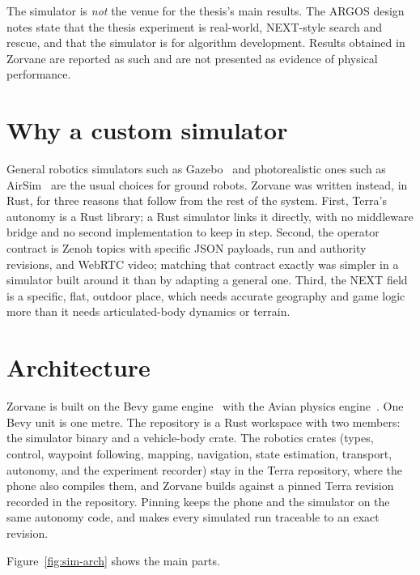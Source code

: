 The simulator is \emph{not} the venue for the thesis's main results.
The ARGOS design notes state that the thesis experiment is real-world, NEXT-style search and rescue, and that the simulator is for algorithm development.
Results obtained in Zorvane are reported as such and are not presented as evidence of physical performance.

\section{Why a custom simulator}
\label{sec:sim-why}

General robotics simulators such as Gazebo~\citep{koenig2004gazebo} and photorealistic ones such as AirSim~\citep{shah2017airsim} are the usual choices for ground robots.
Zorvane was written instead, in Rust, for three reasons that follow from the rest of the system.
First, Terra's autonomy is a Rust library; a Rust simulator links it directly, with no middleware bridge and no second implementation to keep in step.
Second, the operator contract is Zenoh topics with specific JSON payloads, run and authority revisions, and WebRTC video; matching that contract exactly was simpler in a simulator built around it than by adapting a general one.
Third, the NEXT field is a specific, flat, outdoor place, which needs accurate geography and game logic more than it needs articulated-body dynamics or terrain.

\section{Architecture}
\label{sec:sim-arch}

Zorvane is built on the Bevy game engine~\citep{bevy2026} with the Avian physics engine~\citep{avian2026}.
One Bevy unit is one metre.
The repository is a Rust workspace with two members: the simulator binary and a vehicle-body crate.
The robotics crates (types, control, waypoint following, mapping, navigation, state estimation, transport, autonomy, and the experiment recorder) stay in the Terra repository, where the phone also compiles them, and Zorvane builds against a pinned Terra revision recorded in the repository.
Pinning keeps the phone and the simulator on the same autonomy code, and makes every simulated run traceable to an exact revision.

Figure~\ref{fig:sim-arch} shows the main parts.

